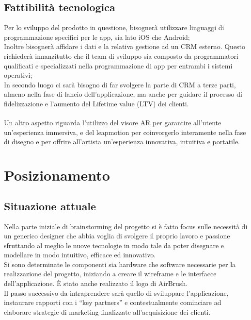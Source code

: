 \documentclass[11pt,fleqn]{book} %
\begin{document}
\section{Fattibilità tecnologica}
Per lo sviluppo del prodotto in questione, bisognerà utilizzare linguaggi di programmazione specifici per le app, sia lato iOS che Android;\\ Inoltre bisognerà affidare i dati e la relativa gestione ad un CRM esterno. Questo richiederà innanzitutto che il team di sviluppo sia composto da programmatori qualificati e specializzati nella programmazione di app per entrambi i sistemi operativi;\\
In secondo luogo ci sarà bisogno di far svolgere la parte di CRM a terze parti, almeno nella fase di lancio dell'applicazione, ma anche per guidare il processo di fidelizzazione e l'aumento del Lifetime value (LTV) dei clienti.\\\\
Un altro aspetto riguarda l'utilizzo del visore AR per garantire all'utente un'esperienza immersiva, e del leapmotion per coinvorgerlo interamente nella fase di disegno e per offrire all'artista un'esperienza innovativa, intuitiva e portatile.





\chapter{Posizionamento}

\section{Situazione attuale}
Nella parte iniziale di brainstorming del progetto si è fatto focus sulle necessità di un generico designer che abbia voglia di svolgere il proprio lavoro e passione sfruttando al meglio le nuove tecnologie in modo tale da poter disegnare e modellare in modo intuitivo, efficace ed innovativo.
\\Si sono determinate le componenti sia hardware che software necessarie per la realizzazione del progetto, iniziando a creare il wireframe e le interfacce dell'applicazione. È stato anche realizzato il logo di AirBrush.\\
Il passo successivo da intraprendere sarà quello di sviluppare l'applicazione, instaurare
rapporti con i “key partners” e contestualmente cominciare ad elaborare strategie di marketing finalizzate all'acquisizione dei clienti.
\\
\end{document}
